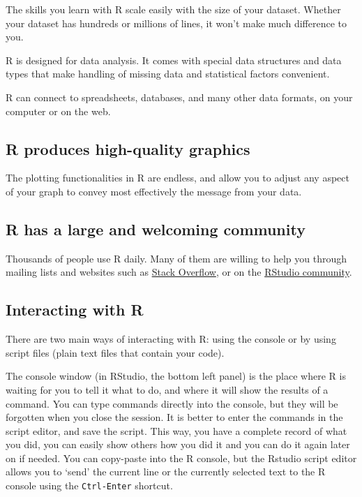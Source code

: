 \documentclass[
]{book}
\begin{document}
The skills you learn with R scale easily with the size of your dataset. Whether your dataset has hundreds or millions of lines, it won't make much difference to you.

R is designed for data analysis. It comes with special data structures and data types that make handling of missing data and statistical factors convenient.

R can connect to spreadsheets, databases, and many other data formats, on your computer or on the web.

\hypertarget{r-produces-high-quality-graphics}{%
\subsection*{R produces high-quality graphics}\label{r-produces-high-quality-graphics}}

The plotting functionalities in R are endless, and allow you to adjust any aspect of your graph to convey most effectively the message from your data.

\hypertarget{r-has-a-large-and-welcoming-community}{%
\subsection*{R has a large and welcoming community}\label{r-has-a-large-and-welcoming-community}}

Thousands of people use R daily. Many of them are willing to help you through mailing lists and websites such as \href{https://stackoverflow.com}{Stack Overflow}, or on the \href{https://community.rstudio.com/}{RStudio community}.

\hypertarget{interacting-with-r}{%
\subsection*{Interacting with R}\label{interacting-with-r}}

There are two main ways of interacting with R: using the console or by using
script files (plain text files that contain your code).

The console window (in RStudio, the bottom left panel) is the place where R is waiting for you to tell it what to do, and where it will show the results of a command. You can type commands directly into the console, but they will be forgotten when you close the session. It is better to enter the commands in the script editor, and save the script. This way, you have a complete record of what you did, you can easily show others how you did it and you can do it again later on if needed. You can copy-paste into the R console, but the Rstudio script editor allows you to `send' the current line or the currently selected text to the R console using the \texttt{Ctrl-Enter} shortcut.
\end{document}
